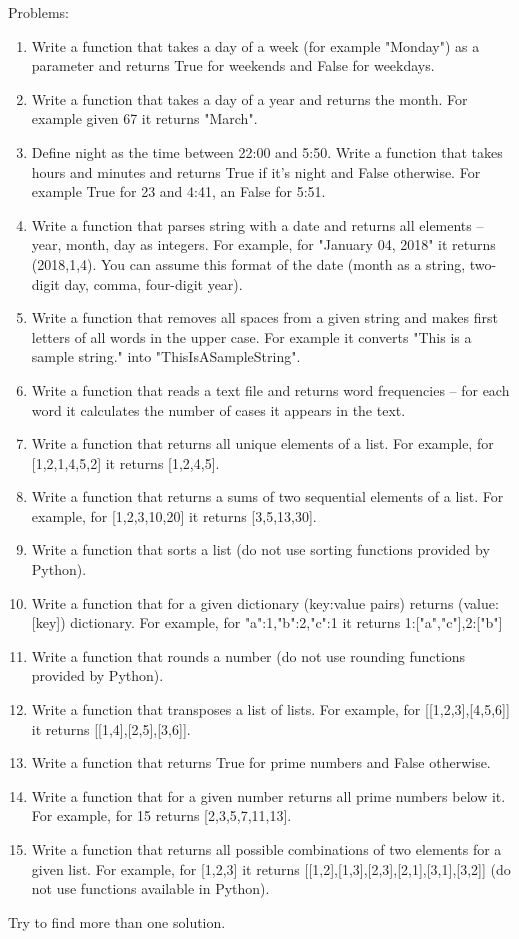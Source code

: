Problems:

\begin{enumerate}
\item Write a function that takes a day of a week (for example "Monday")
as a parameter and returns True for weekends and False for weekdays.
\item Write a function that takes a day of a year and returns 
the month. For example given 67 it returns "March".
\item Define night as the time between 22:00 and 5:50. 
Write a function that takes hours and minutes and returns True if
it's night and False otherwise. For example True for 23 and 4:41, 
an False for 5:51.
\item Write a function that parses string with a date and returns
all elements -- year, month, day as integers. For example, for
"January 04, 2018" it returns (2018,1,4). You can assume this format of
the date (month as a string, two-digit day, comma, four-digit year).
\item Write a function that removes all spaces from a given string
and makes first letters of all words in the upper case. For example
it converts "This is a sample string." into "ThisIsASampleString".
\item Write a function that reads a text file and returns word frequencies 
-- for each word it calculates the number of cases it appears in the
text.
\item Write a function that returns all unique elements of a list. 
For example, for [1,2,1,4,5,2] it returns [1,2,4,5].
\item Write a function that returns a sums of two sequential elements of
a list. For example, for [1,2,3,10,20] it returns [3,5,13,30]. 
\item Write a function that sorts a list (do not use sorting functions 
provided by Python). 
\item Write a function that for a given dictionary (key:value pairs)
returns (value:[key]) dictionary. For example, for {"a":1,"b":2,"c":1}
it returns {1:["a","c"],2:["b"]}
\item Write a function that rounds a number (do not use rounding functions
provided by Python).
\item Write a function that transposes a list of lists. For example,
for [[1,2,3],[4,5,6]] it returns [[1,4],[2,5],[3,6]].
\item Write a function that returns True for prime numbers and
False otherwise.
\item Write a function that for a given number 
returns all prime numbers below it. For example, for 15 returns
[2,3,5,7,11,13].
\item Write a function that returns all possible combinations
of two elements for a given list. For example, for [1,2,3] it
returns [[1,2],[1,3],[2,3],[2,1],[3,1],[3,2]] (do not use
functions available in Python).
\end{enumerate}

Try to find more than one solution. 








